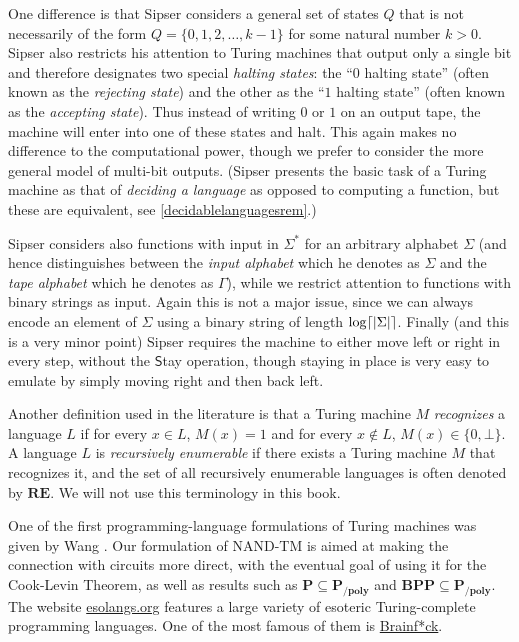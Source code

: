 One difference is that Sipser considers a general set of states \(Q\)
that is not necessarily of the form \(Q=\{0,1,2,\ldots, k-1\}\) for some
natural number \(k>0\). Sipser also restricts his attention to Turing
machines that output only a single bit and therefore designates two
special \emph{halting states}: the ``\(0\) halting state'' (often known
as the \emph{rejecting state}) and the other as the ``\(1\) halting
state'' (often known as the \emph{accepting state}). Thus instead of
writing \(0\) or \(1\) on an output tape, the machine will enter into
one of these states and halt. This again makes no difference to the
computational power, though we prefer to consider the more general model
of multi-bit outputs. (Sipser presents the basic task of a Turing
machine as that of \emph{deciding a language} as opposed to computing a
function, but these are equivalent, see \cref{decidablelanguagesrem}.)

Sipser considers also functions with input in \(\Sigma^*\) for an
arbitrary alphabet \(\Sigma\) (and hence distinguishes between the
\emph{input alphabet} which he denotes as \(\Sigma\) and the \emph{tape
alphabet} which he denotes as \(\Gamma\)), while we restrict attention
to functions with binary strings as input. Again this is not a major
issue, since we can always encode an element of \(\Sigma\) using a
binary string of length \(\log \lceil |\Sigma| \rceil\). Finally (and this is a
very minor point) Sipser requires the machine to either move left or
right in every step, without the \(\mathsf{S}\)tay operation, though
staying in place is very easy to emulate by simply moving right and then
back left.

Another definition used in the literature is that a Turing machine \(M\)
\emph{recognizes} a language \(L\) if for every \(x\in L\), \(M(x)=1\)
and for every \(x\not\in L\), \(M(x) \in \{0,\bot \}\). A language \(L\)
is \emph{recursively enumerable} if there exists a Turing machine \(M\)
that recognizes it, and the set of all recursively enumerable languages
is often denoted by \(\mathbf{RE}\). We will not use this terminology in
this book.

One of the first programming-language formulations of Turing machines
was given by Wang \cite{Wang1957}. Our formulation of NAND-TM is aimed
at making the connection with circuits more direct, with the eventual
goal of using it for the Cook-Levin Theorem, as well as results such as
\(\mathbf{P} \subseteq \mathbf{P_{/poly}}\) and
\(\mathbf{BPP} \subseteq \mathbf{P_{/poly}}\). The website
\href{https://esolangs.org}{esolangs.org} features a large variety of
esoteric Turing-complete programming languages. One of the most famous
of them is \href{https://esolangs.org/wiki/Brainfuck}{Brainf*ck}.
